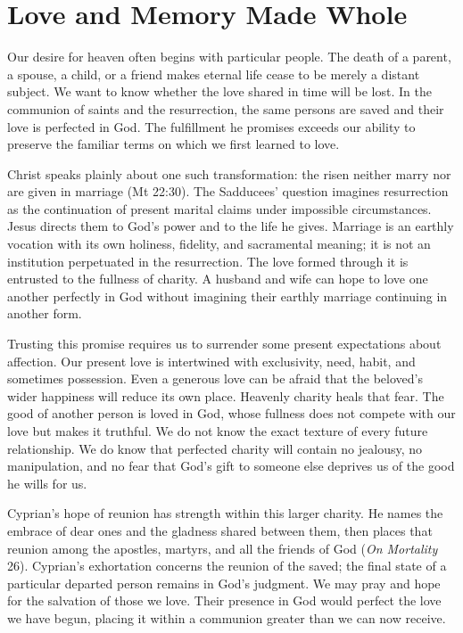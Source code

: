 \section{Love and Memory Made Whole}

Our desire for heaven often begins with particular people. The death of a parent, a spouse, a child, or a friend makes eternal life cease to be merely a distant subject. We want to know whether the love shared in time will be lost. In the communion of saints and the resurrection, the same persons are saved and their love is perfected in God. The fulfillment he promises exceeds our ability to preserve the familiar terms on which we first learned to love.

Christ speaks plainly about one such transformation: the risen neither marry nor are given in marriage (Mt 22:30). The Sadducees' question imagines resurrection as the continuation of present marital claims under impossible circumstances. Jesus directs them to God's power and to the life he gives. Marriage is an earthly vocation with its own holiness, fidelity, and sacramental meaning; it is not an institution perpetuated in the resurrection. The love formed through it is entrusted to the fullness of charity. A husband and wife can hope to love one another perfectly in God without imagining their earthly marriage continuing in another form.

Trusting this promise requires us to surrender some present expectations about affection. Our present love is intertwined with exclusivity, need, habit, and sometimes possession. Even a generous love can be afraid that the beloved's wider happiness will reduce its own place. Heavenly charity heals that fear. The good of another person is loved in God, whose fullness does not compete with our love but makes it truthful. We do not know the exact texture of every future relationship. We do know that perfected charity will contain no jealousy, no manipulation, and no fear that God's gift to someone else deprives us of the good he wills for us.

Cyprian's hope of reunion has strength within this larger charity. He names the embrace of dear ones and the gladness shared between them, then places that reunion among the apostles, martyrs, and all the friends of God (\emph{On Mortality} 26). Cyprian's exhortation concerns the reunion of the saved; the final state of a particular departed person remains in God's judgment. We may pray and hope for the salvation of those we love. Their presence in God would perfect the love we have begun, placing it within a communion greater than we can now receive.

